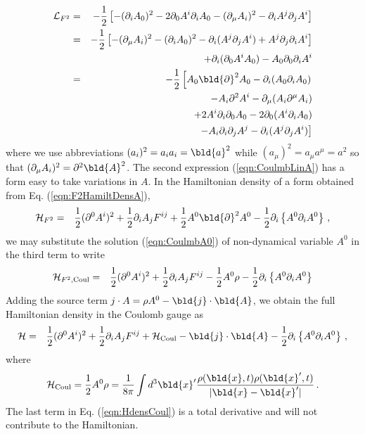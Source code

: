 \begin{eqnarray}
{\cal L}_{F^2}
&=&
-\frac{1}{2}
\left[
-(\partial_i A_0)^2
- 2 \partial_0 A^i \partial_i A_0
- (\partial_\mu  A_i)^2 - 
\partial_i A^j \partial_j A^i
\right]
\label{eqn:CoulmbLagden}
\\
&=&
-\frac{1}{2}
\left[
- (\partial_\mu  A_i)^2 
-(\partial_i A_0)^2
- \partial_i (A^j \partial_j A^i) + A^j \partial_j \partial_i A^i
\right]
\nonumber\\
&&
+ \partial_i( \partial_0 A^i  A_0) -  A_0 \partial_0 \partial_i A^i 
\nonumber\\
&=&
-\frac{1}{2}
\left[
A_0 \bld{\partial}^2 A_0  - \partial_i (A_0 \partial_i A_0)
\right.
\nonumber\\
&&
\hspace{5mm}
- A_i \partial^2 A^i - \partial_\mu(A_i \partial^\mu A_i)
\nonumber\\
&&
\hspace{5mm}
+ 2 A^i \partial_i \partial_0 A_0
- 2 \partial_0 (A^i \partial_i A_0)
\nonumber\\
&&
\left.
\hspace{10mm}
- A_i \partial_i \partial_j A^j
- \partial_i(A^j \partial_j A^i)
\right]
\label{eqn:CoulmbLinA}
\end{eqnarray}
where we use abbreviations  $(a_i)^2 = a_i a_i = \bld{a}^2$ while
$(a_\mu)^2 = a_\mu a^\mu = a^2$ so that
$(\partial_\mu A_i)^2 = \partial^2 \bld{A}^2$.
The second expression (\ref{eqn:CoulmbLinA}) has a form easy to take 
variations in $A$. 
In the Hamiltonian density of a form obtained from Eq. (\ref{eqn:F2HamiltDensA}),
\begin{eqnarray*}
{\cal H}_{F^2} 
&=&
\frac{1}{2}
(\partial^0 A^i)^2
+
\frac{1}{2}
\partial_i A_j F^{ij}
+
\frac{1}{2}
A^0 \bld{\partial}^2 A^0
-
\frac{1}{2}
\partial_i \left\{ A^0 \partial_i A^0 \right\}\,,
\end{eqnarray*}
we may substitute the solution (\ref{eqn:CoulmbA0}) of 
non-dynamical variable $A^0$ in the third term to write
\begin{eqnarray}
{\cal H}_{F^2,\mbox{\scriptsize Coul}} 
&=&
\frac{1}{2}
(\partial^0 A^i)^2
+
\frac{1}{2}
\partial_i A_j F^{ij}
-
\frac{1}{2}
A^0 \rho
-
\frac{1}{2}
\partial_i \left\{ A^0 \partial_i A^0 \right\}
\end{eqnarray}
Adding the source term $j \cdot A = \rho A^0 - \bld{j} \cdot \bld{A}$, we obtain the
full Hamiltonian density in the Coulomb gauge as
\begin{eqnarray}
{\cal H} 
&=&
\frac{1}{2}
(\partial^0 A^i)^2
+
\frac{1}{2}
\partial_i A_j F^{ij}
+
{\cal H}_{\mbox{\scriptsize Coul}}
- \bld{j} \cdot \bld{A}
-
\frac{1}{2}
\partial_i \left\{ A^0 \partial_i A^0 \right\}\,,
\label{eqn:HdensCoul}
\end{eqnarray}
where 
\begin{eqnarray}
{\cal H}_{\mbox{\scriptsize Coul}}
=
\frac{1}{2} A^0 \rho
=
\frac{1}{8\pi} \int
d^3 \bld{x}' 
\frac{\rho(\bld{x}, t) \rho(\bld{x}', t)}{|\bld{x} - \bld{x}'|}\,.
\end{eqnarray}
The last term in Eq. (\ref{eqn:HdensCoul}) is a total derivative
and will not contribute to the Hamiltonian.


